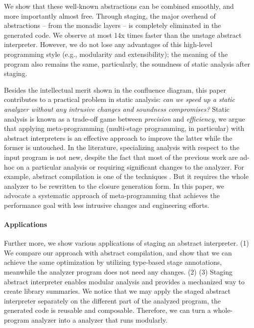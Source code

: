 We show that these well-known abstractions can be combined smoothly, and more
importantly almost free. Through staging, the major overhead of
abstractions -- from the monadic layers -- is completely eliminated in the
generated code. We observe at most 14x times faster than the unstage abstract
interpreter.
However, we do not lose any advantages of this high-level programming style
(e.g., modularity and extensibility); the meaning of the program also remains
the same, particularly, the soundness of static analysis after staging.

Besides the intellectual merit shown in the confluence diagram, this paper
contributes to a practical problem in static analysis: \textit{can we speed up a
static analyzer without any intrusive changes and soundness compromises?} Static
analysis is known as a trade-off game between \textit{precision} and
\textit{efficiency}, we argue that applying meta-programming (multi-stage
programming, in particular) with abstract interpreters is an effective approach
to improve the latter while the former is untouched.
In the literature, specializing analysis with respect to the input program
\cite{damian1999partial, amtoft1999partial, Boucher:1996:ACN:647473.727587,
ashley:practical} is not new, despite the fact that most of the previous work
are ad-hoc on a particular analysis or requiring significant changes to the
analyzer. For example, abstract compilation is one of the techniques
\cite{Boucher:1996:ACN:647473.727587}. But it requires the whole analyzer to be
rewritten to the closure generation form. In this paper, we advocate a systematic
approach of meta-programming that achieves the performance goal with less
intrusive changes and engineering efforts.

\paragraph{Applications}

Further more, we show various applications of staging an abstract interpreter.
(1) We compare our approach with abstract compilation, and show that we can
achieve the same optimization by utilizing type-based stage annotations,
meanwhile the analyzer program does not need any changes. (2) \todo{} (3)
Staging abstract interpreter enables modular analysis and provides a mechanized
way to create library summaries. We notice that we may apply the staged abstract
interpreter separately on the different part of the analyzed program, the
generated code is reusable and composable. Therefore, we can turn a
whole-program analyzer into a analyzer that runs modularly.


